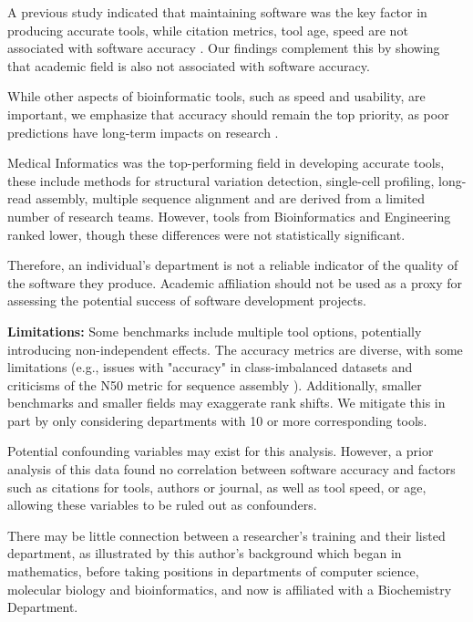 \documentclass[fleqn,10pt,doc,onecolumn]{SelfArx}%
\begin{document}
A previous study indicated that maintaining software was the key
factor in producing accurate tools, while citation metrics, tool age,
speed are not associated with software accuracy \cite{Gardner:2022}.
Our findings complement this by showing that academic field is also not
associated with software accuracy.

While other aspects of bioinformatic tools, such as speed and
usability, are important, we emphasize that accuracy should remain the
top priority, as poor predictions have long-term impacts on
research \cite{weber2019essential}.

Medical Informatics was the top-performing field in developing
accurate tools, these include methods for structural variation
detection, single-cell profiling, long-read assembly, multiple
sequence alignment and are derived from a limited number of research
teams. However, tools from Bioinformatics and Engineering
ranked lower, though these differences were not statistically
significant.

Therefore, an individual’s department is not a reliable indicator of the
quality of the software they produce. Academic affiliation should not
be used as a proxy for assessing the potential success of software
development projects.

\textbf{Limitations:} Some benchmarks include multiple tool options,
potentially introducing non-independent effects. The accuracy metrics
are diverse, with some limitations (e.g., issues with "accuracy" in
class-imbalanced datasets \cite{luque2019impact} and criticisms of the
N50 metric for sequence assembly \cite{xie2021pdr}). Additionally,
smaller benchmarks and smaller fields may exaggerate rank shifts. We
mitigate this in part by only considering departments with 10 or more
corresponding tools. 


\textcolor{rv2}{Potential confounding variables may exist for this
  analysis. However, a prior analysis of this data \cite{Gardner:2022} found no
  correlation between software accuracy and factors such as citations for tools, authors or
  journal, as well as tool speed, or age, allowing these variables
  to be ruled out as confounders.}

There may be little connection between a researcher’s training and
their listed department, as illustrated by this author’s background
which began in mathematics, before taking positions in departments of
computer science, molecular biology and bioinformatics, and now is
affiliated with a Biochemistry Department.
\end{document}
